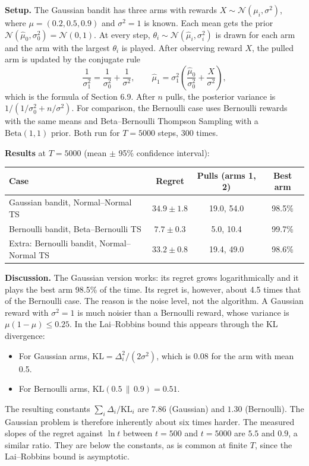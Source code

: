 \documentclass[12pt,a4paper]{article}
\begin{document}
\textbf{Setup.} The Gaussian bandit has three arms with rewards $X \sim \mathcal{N}(\mu_i, \sigma^2)$, where $\mu = (0.2, 0.5, 0.9)$ and $\sigma^2 = 1$ is known.
Each mean gets the prior $\mathcal{N}(\hat{\mu}_0, \sigma_0^2) = \mathcal{N}(0, 1)$.
At every step, $\theta_i \sim \mathcal{N}(\hat{\mu}_i, \sigma_i^2)$ is drawn for each arm and the arm with the largest $\theta_i$ is played.
After observing reward $X$, the pulled arm is updated by the conjugate rule
\[
\frac{1}{\sigma_{1}^2} = \frac{1}{\sigma_{0}^2} + \frac{1}{\sigma^2}, \qquad \hat{\mu}_1 = \sigma_1^2\left(\frac{\hat{\mu}_0}{\sigma_0^2} + \frac{X}{\sigma^2}\right),
\]
which is the formula of Section 6.9. After $n$ pulls, the posterior variance is $1/(1/\sigma_0^2 + n/\sigma^2)$.
For comparison, the Bernoulli case uses Bernoulli rewards with the same means and Beta--Bernoulli Thompson Sampling with a $\mathrm{Beta}(1,1)$ prior.
Both run for $T=5000$ steps, 300 times.

\textbf{Results} at $T=5000$ (mean $\pm$ 95\% confidence interval):
\begin{center}
\small\begin{tabular}{lccc}
\hline
Case & Regret & Pulls (arms 1, 2) & Best arm \\
\hline
Gaussian bandit, Normal--Normal TS & $34.9 \pm 1.8$ & 19.0, 54.0 & 98.5\% \\
Bernoulli bandit, Beta--Bernoulli TS & $7.7 \pm 0.3$ & 5.0, 10.4 & 99.7\% \\
\hline
Extra: Bernoulli bandit, Normal--Normal TS & $33.2 \pm 0.8$ & 19.4, 49.0 & 98.6\% \\
\hline
\end{tabular}
\end{center}

\textbf{Discussion.} The Gaussian version works: its regret grows logarithmically and it plays the best arm 98.5\% of the time.
Its regret is, however, about 4.5 times that of the Bernoulli case.
The reason is the noise level, not the algorithm.
A Gaussian reward with $\sigma^2 = 1$ is much noisier than a Bernoulli reward, whose variance is $\mu(1-\mu) \le 0.25$.
In the Lai--Robbins bound this appears through the KL divergence:
\begin{itemize}
\item For Gaussian arms, $\mathrm{KL} = \Delta_i^2/(2\sigma^2)$, which is $0.08$ for the arm with mean 0.5.
\item For Bernoulli arms, $\mathrm{KL}(0.5\,\|\,0.9) = 0.51$.
\end{itemize}
The resulting constants $\sum_i \Delta_i/\mathrm{KL}_i$ are $7.86$ (Gaussian) and $1.30$ (Bernoulli).
The Gaussian problem is therefore inherently about six times harder.
The measured slopes of the regret against $\ln t$ between $t=500$ and $t=5000$ are $5.5$ and $0.9$, a similar ratio.
They are below the constants, as is common at finite $T$, since the Lai--Robbins bound is asymptotic.
\end{document}
